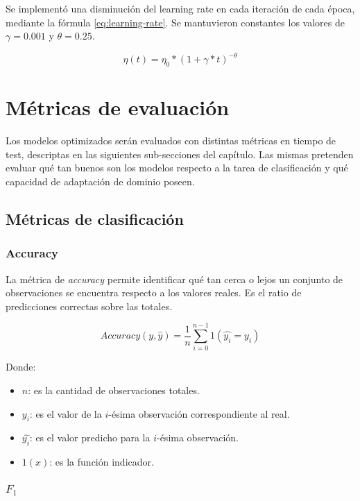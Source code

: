 Se implementó una disminución del learning rate en cada iteración de cada época, mediante la fórmula
\ref{eq:learning-rate}. Se mantuvieron constantes los valores de $\gamma=0.001$ y $\theta = 0.25$.

\begin{equation}
    \eta(t) = \eta_0 * (1 + \gamma * t)^{-\theta}
    \label{eq:learning-rate}
\end{equation}

\section{Métricas de evaluación}

Los modelos optimizados serán evaluados con distintas métricas en tiempo de test, descriptas en las siguientes
sub-secciones del capítulo. Las mismas pretenden evaluar qué tan buenos son los modelos respecto a la tarea de
clasificación y qué capacidad de adaptación de dominio poseen.

\subsection{Métricas de clasificación}
\subsubsection{Accuracy}

La métrica de {\it accuracy} permite identificar qué tan cerca o lejos un conjunto de observaciones se encuentra
respecto a los valores reales. Es el ratio de predicciones correctas sobre las totales.

\begin{equation}
    Accuracy(y, \hat{y}) = \frac{1}{n} \sum_{i=0}^{n-1} 1(\hat{y_{i}}=y_{i})
\end{equation}

Donde:
\begin{itemize}
    \item $n$: es la cantidad de observaciones totales.
    \item $y_{i}$: es el valor de la ${i}$-ésima observación correspondiente al real.
    \item $\hat{y_{i}}$: es el valor predicho para la ${i}$-ésima observación.
    \item $1(x)$: es la función indicador.
\end{itemize}

\subsubsection{$F_{1}$}

